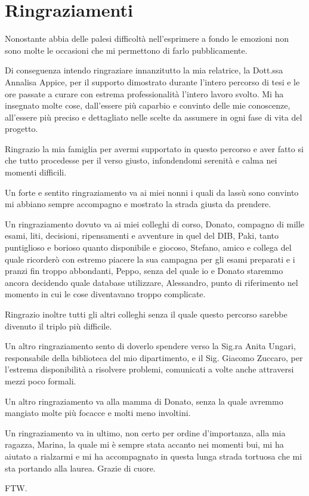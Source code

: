\documentclass[12pt,a4paper,oneside,openright]{book}
\begin{document}
\chapter*{Ringraziamenti}
Nonostante abbia delle palesi difficoltà nell'esprimere a fondo le emozioni non sono molte le occasioni che mi permettono di farlo pubblicamente.

Di conseguenza intendo ringraziare innanzitutto la mia relatrice, la Dott.ssa Annalisa Appice, per il supporto dimostrato durante l'intero percorso di tesi e le ore passate a curare con estrema professionalità l'intero lavoro svolto. Mi ha insegnato molte cose, dall'essere più caparbio e convinto delle mie conoscenze, all'essere più preciso e dettagliato nelle scelte da assumere in ogni fase di vita del progetto.

Ringrazio la mia famiglia per avermi supportato in questo percorso e aver fatto si che tutto procedesse per il verso giusto, infondendomi serenità e calma nei momenti difficili.

Un forte e sentito ringraziamento va ai miei nonni i quali da lassù sono convinto mi abbiano sempre accompagno e mostrato la strada giusta da prendere.

Un ringraziamento dovuto va ai miei colleghi di corso, Donato, compagno di mille esami, liti, decisioni, ripensamenti e avventure in quel del DIB, Paki, tanto puntiglioso e borioso quanto disponibile e giocoso, Stefano, amico e collega del quale ricorderò con estremo piacere la sua campagna per gli esami preparati e i pranzi fin troppo abbondanti, Peppo, senza del quale io e Donato staremmo ancora decidendo quale database utilizzare, Alessandro, punto di riferimento nel momento in cui le cose diventavano troppo complicate.

Ringrazio inoltre tutti gli altri colleghi senza il quale questo percorso sarebbe divenuto il triplo più difficile.

Un altro ringraziamento sento di doverlo spendere verso la Sig.ra Anita Ungari, responsabile della biblioteca del mio dipartimento, e il Sig. Giacomo Zuccaro, per l'estrema disponibilità a risolvere problemi, comunicati a volte anche attraversi mezzi poco formali. 

Un altro ringraziamento va alla mamma di Donato, senza la quale avremmo mangiato molte più focacce e molti meno involtini.

Un ringraziamento va in ultimo, non certo per ordine d'importanza, alla mia ragazza, Marina, la quale mi è sempre stata accanto nei momenti bui, mi ha aiutato a rialzarmi e mi ha accompagnato in questa lunga strada tortuosa che mi sta portando alla laurea. Grazie di cuore. 

FTW.
\end{document}
